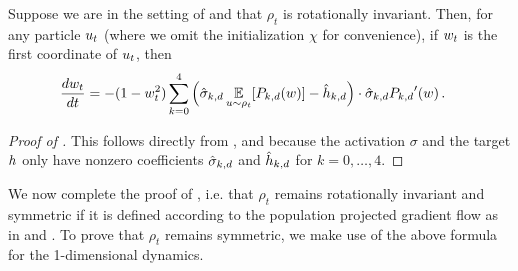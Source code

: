 \begin{lemma}  \label{lemma:1d_velocity_final}
Suppose we are in the setting of  and that $\rho_t$ is rotationally invariant. Then, for any particle $u_t$ (where we omit the initialization $\chi$ for convenience), if $w_t$ is the first coordinate of $u_t$, then
\begin{align}
\frac{dw_t}{dt}
& = -(1 - w_t^2) \sum_{k = 0}^4 \Big(\hat{\sigma}_{k, d} \operatorname*{\mathbb{E}}_{u \sim \rho_t}[{P_{k, d}}(w)] - \hat{h}_{k, d} \Big) \cdot \hat{\sigma}_{k, d} {P_{k, d}}'(w) \,.
\end{align}
\end{lemma}
\begin{proof}[Proof of ]
This follows directly from , and because the activation $\sigma$ and the target $h$ only have nonzero coefficients $\hat{\sigma}_{k, d}$ and $\hat{h}_{k, d}$ for $k = 0, \ldots, 4$.
\end{proof}

We now complete the proof of , i.e. that $\rho_t$ remains rotationally invariant and symmetric if it is defined according to the population projected gradient flow as in  and . To prove that $\rho_t$ remains symmetric, we make use of the above formula for the 1-dimensional dynamics.

